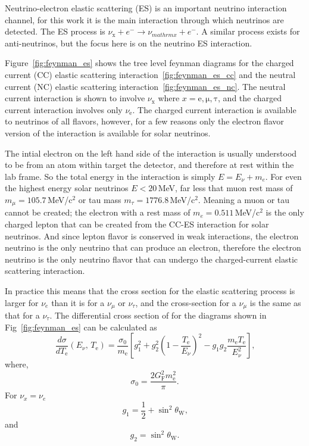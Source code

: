 Neutrino-electron elastic scattering (ES) is an important neutrino interaction
channel, for this work it is the main interaction through which neutrinos are
detected.
The ES process is $\nu_{\mathrm{x}} + e^{-} \rightarrow \nu_{mathrm{x}} +e^{-}$.
A similar process exists for anti-neutrinos, but the focus here is on the
neutrino ES interaction.

Figure~\ref{fig:feynman_es} shows the tree level feynman diagrams for the charged
current (CC) elastic scattering interaction~\ref{fig:feynman_es_cc} and the
neutral current (NC) elastic scattering interaction~\ref{fig:feynman_es_nc}.
The neutral current interaction is shown to involve $\nu_{\mathrm{x}}$ where $x=\mathrm{e, \mu, \tau}$,
and the charged current interaction involves only $\nu_{\mathrm{e}}$.
The charged current interaction is available to neutrinos of all flavors,
however, for a few reasons only the electron flavor version of the interaction
is available for solar neutrinos.

The intial electron on the left hand side of the interaction is usually understood to
be from an atom within target the detector, and therefore at rest within
the lab frame.
So the total energy in the interaction is simply $E = E_{\nu} + m_{e}$.
For even the highest energy solar neutrinos $E<20$\,MeV, far less that muon
rest mass of $m_{\mu}=105.7$\,MeV/$\text{c}^{2}$ or tau mass $m_\tau = 1776.8$\,MeV/$\text{c}^{2}$.
Meaning a muon or tau cannot be created; the electron with a rest mass
of $m_{e}=0.511$\,MeV/$\text{c}^{2}$ is the only charged lepton that can
be created from the CC-ES interaction for solar neutrinos.
And since lepton flavor is conserved in weak interactions, the electron neutrino
is the only neutrino that can produce an electron, therefore the electron
neutrino is the only neutrino flavor that can undergo the charged-current
elastic scattering interaction.

In practice this means that the cross section for the elastic scattering process
is larger for $\nu_{e}$ than it is for a $\nu_\mu$ or $\nu_\tau$,
and the cross-section for a $\nu_\mu$ is the same as that for a $\nu_\tau$.
The differential cross section of for the diagrams shown in Fig~\ref{fig:feynman_es}
can be calculated as
\begin{equation}
    \frac{d\sigma}{dT_{\mathrm{e}}}\left(E_{\nu}\text{, }T_{\mathrm{e}}\right)=
    \frac{\sigma_{0}}{m_{\mathrm{e}}}\left[g_{1}^{2} + g_{2}^{2}\left(1 - \frac{T_{\mathrm{e}}}{E_{\nu}}\right)^{2} -g_{1}g_{2}\frac{m_{\mathrm{e}}T_{\mathrm{e}}}{E_{\nu}^{2}}\right]\text{,}
\end{equation}
where,
\begin{equation}
    \sigma_{0} = \frac{2G^{2}_{\mathrm{F}}m_{\mathrm{e}}^{2}}{\pi}\text{.}
\end{equation}
For $\nu_{x} = \nu_{e}$
\begin{equation}
    g_{1} = \frac{1}{2} + \sin^{2}\theta_{\mathrm{W}}\text{,}
\end{equation}
and
\begin{equation}
    g_{2} = \sin^{2}\theta_{\mathrm{W}}\text{.}
\end{equation}

